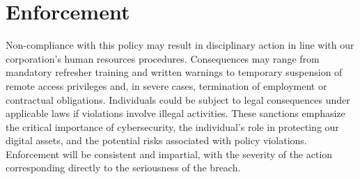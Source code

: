 \section{Enforcement}
Non-compliance with this policy may result in disciplinary action in line with our corporation's human resources procedures. Consequences may range from mandatory refresher training and written warnings to temporary suspension of remote access privileges and, in severe cases, termination of employment or contractual obligations. Individuals could be subject to legal consequences under applicable laws if violations involve illegal activities. These sanctions emphasize the critical importance of cybersecurity, the individual's role in protecting our digital assets, and the potential risks associated with policy violations. Enforcement will be consistent and impartial, with the severity of the action corresponding directly to the seriousness of the breach.